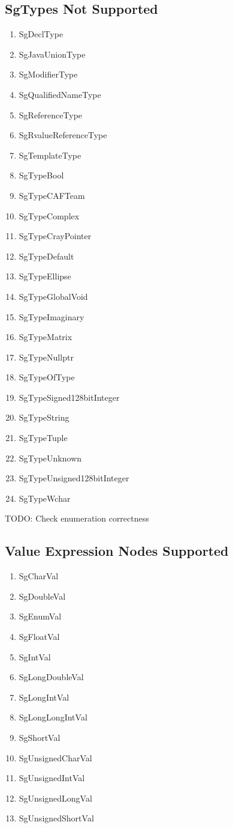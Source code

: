 \documentclass[11pt]{article}
\begin{document}
{\begin{enumeration}
\subsection{SgTypes Not Supported}
\begin{enumerate}
\item SgDeclType
\item SgJavaUnionType
\item SgModifierType
\item SgQualifiedNameType
\item SgReferenceType
\item SgRvalueReferenceType
\item SgTemplateType
\item SgTypeBool
\item SgTypeCAFTeam
\item SgTypeComplex
\item SgTypeCrayPointer
\item SgTypeDefault
\item SgTypeEllipse
\item SgTypeGlobalVoid
\item SgTypeImaginary
\item SgTypeMatrix
\item SgTypeNullptr
\item SgTypeOfType
\item SgTypeSigned128bitInteger
\item SgTypeString
\item SgTypeTuple
\item SgTypeUnknown
\item SgTypeUnsigned128bitInteger
\item SgTypeWchar
\end{enumerate}
TODO: Check enumeration correctness
\subsection{Value Expression Nodes Supported}
\begin{enumerate}
\item SgCharVal
\item SgDoubleVal
\item SgEnumVal
\item SgFloatVal
\item SgIntVal
\item SgLongDoubleVal
\item SgLongIntVal
\item SgLongLongIntVal
\item SgShortVal  
\item SgUnsignedCharVal
\item SgUnsignedIntVal
\item SgUnsignedLongVal
\item SgUnsignedShortVal
\end{enumerate}

\end{enumeration}}
\end{document}
